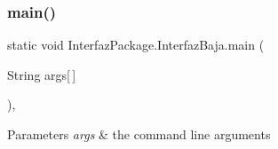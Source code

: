 \subsubsection{\texorpdfstring{main()}{main()}}
{\footnotesize\ttfamily static void Interfaz\+Package.\+Interfaz\+Baja.\+main (\begin{DoxyParamCaption}\item[{String}]{args\mbox{[}$\,$\mbox{]} }\end{DoxyParamCaption})\hspace{0.3cm}{\ttfamily [inline]}, {\ttfamily [static]}}


\begin{DoxyParams}{Parameters}
{\em args} & the command line arguments \\
\hline
\end{DoxyParams}


